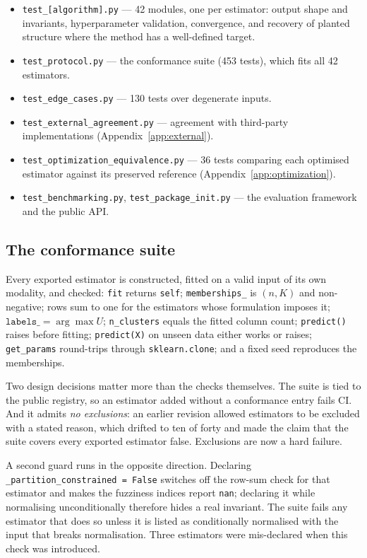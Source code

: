 \documentclass[twoside,11pt]{article}
\begin{document}
\begin{itemize}[leftmargin=1.5em]
\item \texttt{test\_[algorithm].py} --- 42 modules, one per estimator:
output shape and invariants, hyperparameter validation, convergence, and
recovery of planted structure where the method has a well-defined target.
\item \texttt{test\_protocol.py} --- the conformance suite (453 tests), which
fits all 42 estimators.
\item \texttt{test\_edge\_cases.py} --- 130 tests over degenerate inputs.
\item \texttt{test\_external\_agreement.py} --- agreement with third-party
implementations (Appendix~\ref{app:external}).
\item \texttt{test\_optimization\_equivalence.py} --- 36 tests comparing each
optimised estimator against its preserved reference
(Appendix~\ref{app:optimization}).
\item \texttt{test\_benchmarking.py}, \texttt{test\_package\_init.py} ---
the evaluation framework and the public API.
\end{itemize}

\subsection{The conformance suite}

Every exported estimator is constructed, fitted on a valid input of its own
modality, and checked: \texttt{fit} returns \texttt{self};
\texttt{memberships\_} is $(n, K)$ and non-negative; rows sum to one for the
estimators whose formulation imposes it; $\texttt{labels\_} = \arg\max U$;
\texttt{n\_clusters} equals the fitted column count; \texttt{predict()} raises
before fitting; \texttt{predict(X)} on unseen data either works or raises;
\texttt{get\_params} round-trips through \texttt{sklearn.clone}; and a fixed
seed reproduces the memberships.

Two design decisions matter more than the checks themselves. The suite is
tied to the public registry, so an estimator added without a conformance
entry fails CI. And it admits \emph{no exclusions}: an earlier revision
allowed estimators to be excluded with a stated reason, which drifted to ten
of forty and made the claim that the suite covers every exported estimator
false. Exclusions are now a hard failure.

A second guard runs in the opposite direction. Declaring
\texttt{\_partition\_constrained = False} switches off the row-sum check for
that estimator and makes the fuzziness indices report \texttt{nan}; declaring
it while normalising unconditionally therefore hides a real invariant. The
suite fails any estimator that does so unless it is listed as conditionally
normalised with the input that breaks normalisation. Three estimators were
mis-declared when this check was introduced.
\end{document}
